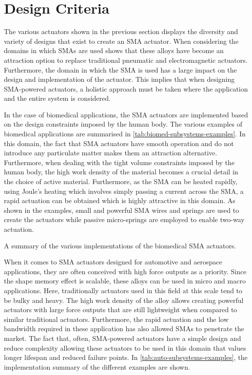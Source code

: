 \section{Design Criteria}
The various actuators shown in the previous section displays the diversity and variety of designs that exist to create an SMA actuator. When considering the domains in which SMAs are used shows that these alloys have become an attraction option to replace traditional pneumatic and electromagnetic actuators. Furthermore, the domain in which the SMA is used has a large impact on the design and implementation of the actuator. This implies that when designing SMA-powered actuators, a holistic approach must be taken where the application and the entire system is considered.

In the case of biomedical applications, the SMA actuators are implemented based on the design constraints imposed by the human body. The various examples of biomedical applications are summarised in \cref{tab:biomed-subsystems-examples}. In this domain, the fact that SMA actuators have smooth operation and do not introduce any particulate matter makes them an attraction alternative. Furthermore, when dealing with the tight volume constraints imposed by the human body, the high work density of the material becomes a crucial detail in the choice of active material. Furthermore, as the SMA can be heated rapidly, using Joule's heating which involves simply passing a current across the SMA, a rapid actuation can be obtained which is highly attractive in this domain. As shown in the examples, small and powerful SMA wires and springs are used to create the actuators while passive micro-springs are employed to enable two-way actuation.

\begin{table}[hbt]
    \centering
    \caption{A summary of the various implementations of the biomedical SMA actuators.}
    
    \label{tab:biomed-subsystems-examples}
\end{table}

When it comes to SMA actuators designed for automotive and aerospace applications, they are often conceived with high force outputs as a priority. Since the shape memory effect is scalable, these alloys can be used in micro and macro applications. Here, traditionally actuators used in this field at this scale tend to be bulky and heavy. The high work density of the alloy allows creating powerful actuators with large force outputs that are still lightweight when compared to similar traditional actuators. Furthermore, the rapid actuation and the low bandwidth required in these application has also allowed SMAs to penetrate the market. The fact that, often, SMA-powered actuators have a simple design and reduce complexity allowing these actuators to be used in this domain that values longer lifespan and reduced failure points. In \cref{tab:auto-subsystems-examples}, the implementation summary of the different examples are shown.

